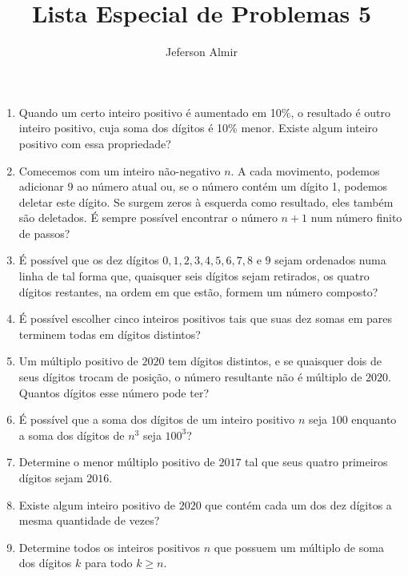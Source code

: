 \documentclass{article}
\title{Lista Especial de Problemas 5}
\author{Jeferson Almir}
\date{}
\begin{document}
\maketitle

\begin{enumerate}
    \item Quando um certo inteiro positivo é aumentado em 10\%,
    o resultado é outro inteiro positivo,
    cuja soma dos dígitos é 10\% menor.
    Existe algum inteiro positivo com essa propriedade?
    
    \item Comecemos com um inteiro não-negativo $n$.
    A cada movimento, podemos adicionar 9 ao número atual ou,
    se o número contém um dígito 1,
    podemos deletar este dígito.
    Se surgem zeros à esquerda como resultado,
    eles também são deletados.
    É sempre possível encontrar o número $n+1$ num número finito de passos?
    
    \item É possível que os dez dígitos $0,1,2,3,4,5,6,7,8$ e $9$
    sejam ordenados numa linha de tal forma que,
    quaisquer seis dígitos sejam retirados,
    os quatro dígitos restantes, na ordem em que estão,
    formem um número composto?
    
    \item É possível escolher cinco inteiros positivos tais que suas dez somas em pares terminem todas em dígitos distintos?
    
    \item Um múltiplo positivo de $2020$ tem dígitos distintos,
    e se quaisquer dois de seus dígitos trocam de posição,
    o número resultante não é múltiplo de $2020$.
    Quantos dígitos esse número pode ter?
    
    \item É possível que a soma dos dígitos de um inteiro positivo $n$
    seja $100$ enquanto a soma dos dígitos de $n^3$ seja $100^3$?
    
    \item Determine o menor múltiplo positivo de $2017$
    tal que seus quatro primeiros dígitos sejam $2016$.
    
    \item Existe algum inteiro positivo de $2020$ que contém cada um dos dez dígitos
    a mesma quantidade de vezes?
    
    \item Determine todos os inteiros positivos $n$ que possuem um múltiplo de soma dos dígitos $k$
    para todo $k\geq n$.
\end{enumerate}
\end{document}
